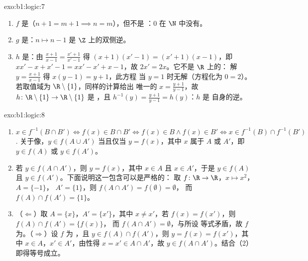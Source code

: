 \begin{solution}{exo:b1:logic:7}
\begin{enumerate}
  \item $f$ 是（$n + 1 = m + 1 \implies n = m$），但不是
        ：$0$ 在 $\N$ 中没有。
  \item $g$ 是：$n \mapsto n - 1$ 是
        $\Z$ 上的双侧逆。
  \item $h$ 是：由 $\frac{x+1}{x-1} = \frac{x'+1}{x'-1}$ 得
        $(x+1)(x'-1) = (x'+1)(x-1)$，即 $xx' - x + x' - 1 = xx' -
        x' + x - 1$，故 $2x' = 2x$。它不是 $\R$ 上的：
        解 $y = \frac{x+1}{x-1}$ 得 $x(y - 1) = y + 1$，此方程
        当 $y = 1$ 时无解（方程化为 $0 = 2$）。
        若取值域为 $\R \setminus \{1\}$，同样的计算给出
        唯一的 $x = \frac{y+1}{y-1}$，故
        $h \colon \R \setminus \{1\} \to \R \setminus \{1\}$ 是
        ，且 $h^{-1}(y) = \frac{y+1}{y-1} = h(y)$：$h$ 是
        自身的逆。
\end{enumerate}
\end{solution}

\begin{solution}{exo:b1:logic:8}
\begin{enumerate}
  \item $x \in f^{-1}(B \cap B') \iff f(x) \in B \cap B' \iff f(x) \in
        B \land f(x) \in B' \iff x \in f^{-1}(B) \cap f^{-1}(B')$.
        关于像，$y \in f(A \cup A')$ 当且仅当 $y = f(x)$，其中 $x$
        属于 $A$ 或 $A'$，即 $y \in f(A)$ 或 $y \in f(A')$。
  \item 若 $y \in f(A \cap A')$，则 $y = f(x)$，其中 $x \in A$ 且
        $x \in A'$，于是 $y \in f(A)$ 且 $y \in f(A')$。下面说明这一包含可以是严格的：
        取 $f \colon \R \to \R$，$x \mapsto x^2$，$A = \{-1\}$，
        $A' = \{1\}$，则 $f(A \cap A') = f(\emptyset) = \emptyset$，
        而 $f(A) \cap f(A') = \{1\}$。
  \item （$\Leftarrow$）取 $A = \{x\}$，$A' = \{x'\}$，其中 $x \neq
        x'$，若 $f(x) = f(x')$，则 $f(A) \cap f(A') = \{f(x)\}$，
        而 $f(A \cap A') = \emptyset$，与所设
        等式矛盾，故 $f$ 为。（$\Rightarrow$）设 $f$ 为
        ，且 $y \in f(A) \cap f(A')$，则 $y = f(x) = f(x')$，其中
        $x \in A$，$x' \in A'$，由性得 $x = x' \in A \cap
        A'$，故 $y \in f(A \cap A')$。结合（2）即得等号成立。
\end{enumerate}
\end{solution}

